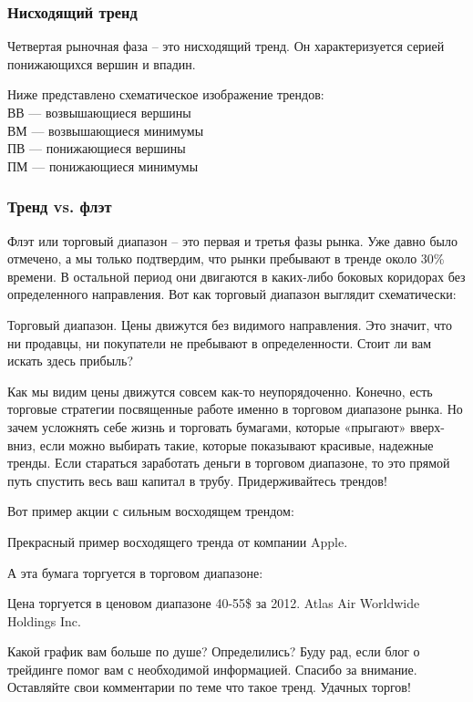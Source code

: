 \documentclass{book}
\begin{document}
\subsubsection{Нисходящий тренд}

Четвертая рыночная фаза – это нисходящий тренд. Он характеризуется серией понижающихся вершин и впадин.

Ниже представлено схематическое изображение трендов:\\

ВВ — возвышающиеся вершины\\
ВМ — возвышающиеся минимумы\\
ПВ — понижающиеся вершины\\
ПМ — понижающиеся минимумы\\

\subsubsection{Тренд vs. флэт}

Флэт или торговый диапазон – это первая и третья фазы рынка. Уже давно было отмечено, а мы только подтвердим, что рынки пребывают в тренде около 30\% времени. В остальной период они двигаются в каких-либо боковых коридорах без определенного направления. Вот как торговый диапазон выглядит схематически:

Торговый диапазон. Цены движутся без видимого направления. Это значит, что ни продавцы, ни покупатели не пребывают в определенности. Стоит ли вам искать здесь прибыль?

Как мы видим цены движутся совсем как-то неупорядоченно. Конечно, есть торговые стратегии посвященные работе именно в торговом диапазоне рынка. Но зачем усложнять себе жизнь и торговать бумагами, которые «прыгают» вверх-вниз, если можно выбирать такие, которые показывают красивые, надежные тренды. Если стараться заработать деньги в торговом диапазоне, то это прямой путь спустить весь ваш капитал в трубу. Придерживайтесь трендов!

Вот пример акции с сильным восходящем трендом:

Прекрасный пример восходящего тренда от компании Apple.

А эта бумага торгуется в торговом диапазоне:

Цена торгуется в ценовом диапазоне 40-55\$ за 2012. Atlas Air Worldwide Holdings Inc.

Какой график вам больше по душе? Определились? Буду рад, если блог о трейдинге помог вам с необходимой информацией. Спасибо за внимание. Оставляйте свои комментарии по теме что такое тренд. Удачных торгов!
\end{document}
